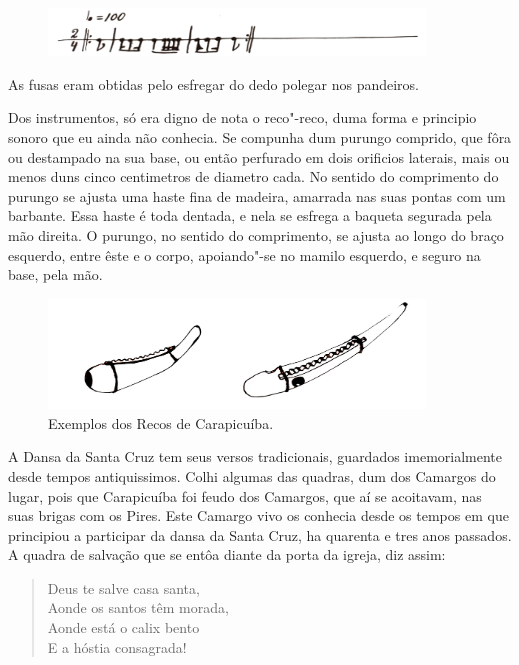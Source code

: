 \begin{figure}[!ht]
\centering
 \includegraphics[width=100mm]{./imgs/img1.jpg}
\end{figure}

As fusas eram obtidas pelo esfregar do dedo polegar nos pandeiros.

Dos instrumentos, só era digno de nota o reco"-reco, duma forma e
principio sonoro que eu ainda não conhecia. Se compunha dum purungo
comprido, que fôra ou destampado na sua base, ou então perfurado em dois
orificios laterais, mais ou menos duns cinco centimetros de diametro
cada. No sentido do comprimento do purungo se ajusta uma haste fina de
madeira, amarrada nas suas pontas com um barbante. Essa haste é toda
dentada, e nela se esfrega a baqueta segurada pela mão direita. O
purungo, no sentido do comprimento, se ajusta ao longo do braço
esquerdo, entre êste e o corpo, apoiando"-se no mamilo esquerdo, e seguro
na base, pela mão.

\begin{figure}[!ht]
\centering
 \includegraphics[width=100mm]{./imgs/img2.png}
\caption{Exemplos dos Recos de Carapicuíba.}
\end{figure}

A Dansa da Santa Cruz tem seus versos tradicionais, guardados
imemorialmente desde tempos antiquissimos. Colhi algumas das quadras,
dum dos Camargos do lugar, pois que Carapicuíba foi feudo dos Camargos,
que aí se acoitavam, nas suas brigas com os Pires. Este Camargo vivo os
conhecia desde os tempos em que principiou a participar da dansa da
Santa Cruz, ha quarenta e tres anos passados. A quadra de salvação que
se entôa diante da porta da igreja, diz assim:

\begin{verse}
Deus te salve casa santa,\\
Aonde os santos têm morada,\\
Aonde está o calix bento\\
E a hóstia consagrada!
\end{verse}

